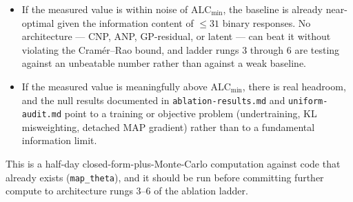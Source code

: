 \documentclass[11pt]{article}
\begin{document}
\begin{itemize}
  \item If the measured value is within noise of $\mathrm{ALC}_{\min}$, the
    baseline is already near-optimal given the information content of
    $\le 31$ binary responses. No architecture --- CNP, ANP, GP-residual,
    or latent --- can beat it without violating the Cram\'er--Rao bound,
    and ladder rungs 3 through 6 are testing against an unbeatable number
    rather than against a weak baseline.
  \item If the measured value is meaningfully above $\mathrm{ALC}_{\min}$,
    there is real headroom, and the null results documented in
    \texttt{ablation-results.md} and \texttt{uniform-audit.md} point to a
    training or objective problem (undertraining, KL misweighting, detached
    MAP gradient) rather than to a fundamental information limit.
\end{itemize}

This is a half-day closed-form-plus-Monte-Carlo computation against code
that already exists (\texttt{map\_theta}), and it should be run before
committing further compute to architecture rungs 3--6 of the ablation
ladder.
\end{document}
